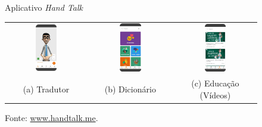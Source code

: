 \begin{figure}[htbp]
\centering
\caption{Aplicativo \textit{Hand Talk}}
\label{proposal:handtalk}
\begin{tabular}{ccc}
\includegraphics[width=0.275\textwidth]{images/handtalk-01.png} & \includegraphics[width=0.275\textwidth]{images/handtalk-02.png} & \includegraphics[width=0.275\textwidth]{images/handtalk-03.png}\\
(a) Tradutor & (b) Dicionário & (c) Educação (Vídeos) \\
\end{tabular}
\caption*{Fonte: \url{www.handtalk.me}.}
\end{figure}

